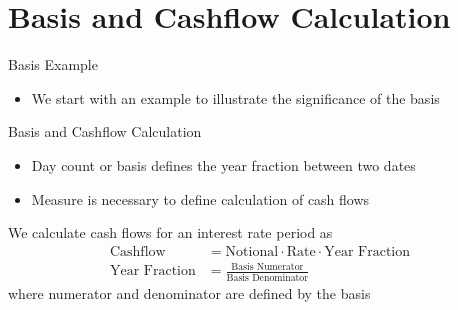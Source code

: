 \documentclass[handout, aspectratio=169]{beamer}
\begin{document}
\section{Basis and Cashflow Calculation}
\begin{frame}{Basis Example}
	\pause
	\begin{itemize}
		\item We start with an example to illustrate the significance of the basis
	\end{itemize}
	\begin{Example}
		\scriptsize
		
	\end{Example}
\end{frame}

\begin{frame}{Basis and Cashflow Calculation}
	\pause
	\begin{itemize}
		\item Day count or basis defines the year fraction between two dates
		\item Measure is necessary to define calculation of cash flows
	\end{itemize}
	\begin{block}{}
		\scriptsize
		We calculate cash flows for an interest rate period as
		\begin{align*}
			\text{Cashflow} &= \text{Notional} \cdot \text{Rate} \cdot \text{Year Fraction}\\
			\text{Year Fraction} &= \frac{\text{Basis Numerator}}{\text{Basis Denominator}}
		\end{align*}
		where numerator and denominator are defined by the basis
	\end{block}
\end{frame}
\end{document}
